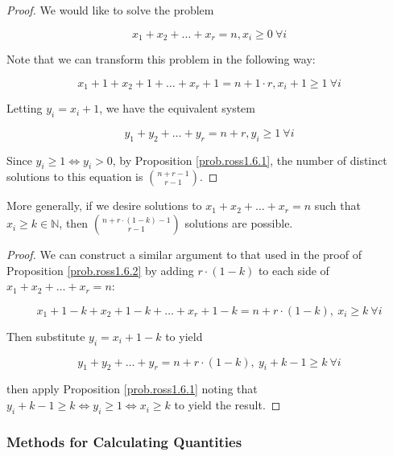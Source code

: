 \begin{proof}We would like to solve the problem

\[
x_1  + x_2 + \ldots + x_r  = n , x_i  \geq 0 \ \forall i
\]

Note that we can transform this problem in the following way:

\[
x_1 + 1 + x_2 + 1 + \ldots + x_r + 1 = n + 1 \cdot r, x_i + 1 \geq 1 \ \forall i
\]

Letting \(y_i = x_i + 1\), we have the equivalent system

\[
y_1 + y_2 + \ldots + y_r = n + r, y_i \geq 1 \ \forall i
\]

Since \(y_i \geq 1 \iff y_i > 0\), by Proposition \ref{prob.ross1.6.1}, the number of distinct solutions to this equation is \(\binom{n+r-1}{r-1}  \).

\end{proof}

\begin{proposition}\label{prob.ross1.6.2general} More generally, if we desire solutions to \(x_1 + x_2 + \ldots + x_r = n\) such that  \(x_i \geq k \in \mathbb{N}\), then  \(\binom{n + r\cdot(1-k)-1}{r-1}\) solutions are possible.

\end{proposition}

\begin{proof}
We can construct a similar argument to that used in the proof of Proposition \ref{prob.ross1.6.2} by adding \(r \cdot(1-k) \) to each side of \(x_1 + x_2 + \ldots + x_r = n\):

\[
x_1 + 1 - k + x_2 + 1 - k + \ldots + x_r  + 1 - k= n + r\cdot(1-k), \ x_i \geq k \ \forall i
\]

Then substitute \(y_i = x_i + 1 - k\) to yield 

\[
y_1+ y_2 + \ldots + y_ r = n + r\cdot(1-k), \ y_i + k - 1\geq k \ \forall i
\]

then apply Proposition \ref{prob.ross1.6.1} noting that \(y_i + k - 1\geq k \iff y_i \geq 1 \iff x_i \geq k\) to yield the result.
\end{proof}

\subsubsection{Methods for Calculating Quantities}

